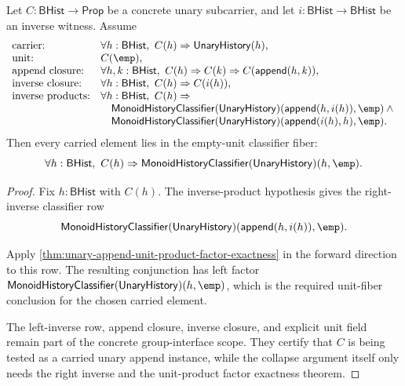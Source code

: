 \begin{theorem}
\label{thm:unary-append-group-subcarrier-unit-collapse}
Let $C:\mathsf{BHist}\to\mathsf{Prop}$ be a concrete unary subcarrier, and let
$i:\mathsf{BHist}\to\mathsf{BHist}$ be an inverse witness. Assume
$$
\begin{array}{ll}
\text{\rm carrier:} &
\forall h:\mathsf{BHist},\ C(h)\Rightarrow \mathsf{UnaryHistory}(h),\\
\text{\rm unit:} & C(\emp),\\
\text{\rm append closure:} &
\forall h,k:\mathsf{BHist},\
C(h)\Rightarrow C(k)\Rightarrow C(\mathsf{append}(h,k)),\\
\text{\rm inverse closure:} &
\forall h:\mathsf{BHist},\
C(h)\Rightarrow C(i(h)),\\
\text{\rm inverse products:} &
\forall h:\mathsf{BHist},\
C(h)\Rightarrow{}\\
&\quad
\mathsf{MonoidHistoryClassifier}(\mathsf{UnaryHistory})
(\mathsf{append}(h,i(h)),\emp)\land{}\\
&\quad
\mathsf{MonoidHistoryClassifier}(\mathsf{UnaryHistory})
(\mathsf{append}(i(h),h),\emp).
\end{array}
$$
Then every carried element lies in the empty-unit classifier fiber:
$$
\forall h:\mathsf{BHist},\
C(h)\Rightarrow
\mathsf{MonoidHistoryClassifier}(\mathsf{UnaryHistory})(h,\emp).
$$
\end{theorem}
\begin{proof}
Fix $h:\mathsf{BHist}$ with $C(h)$. The inverse-product hypothesis gives the
right-inverse classifier row
$$
\mathsf{MonoidHistoryClassifier}(\mathsf{UnaryHistory})
(\mathsf{append}(h,i(h)),\emp).
$$

Apply \autoref{thm:unary-append-unit-product-factor-exactness} in the forward
direction to this row. The resulting conjunction has left factor
$\mathsf{MonoidHistoryClassifier}(\mathsf{UnaryHistory})(h,\emp)$, which is
the required unit-fiber conclusion for the chosen carried element.

The left-inverse row, append closure, inverse closure, and explicit unit field
remain part of the concrete group-interface scope. They certify that $C$ is
being tested as a carried unary append instance, while the collapse argument
itself only needs the right inverse and the unit-product factor exactness
theorem.
\end{proof}

